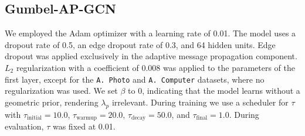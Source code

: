 \documentclass{gdl}
\begin{document}
\subsection{Gumbel-AP-GCN}
\label{lab:hyper-gumbel-gcn}
We employed the Adam optimizer with a learning rate of 0.01. The model uses a dropout rate of 0.5, an edge dropout rate of 0.3, and 64 hidden units. Edge dropout was applied exclusively in the adaptive message propagation component. $L_2$ regularization with a coefficient of 0.008 was applied to the parameters of the first layer, except for the \texttt{A. Photo} and \texttt{A. Computer} datasets, where no regularization was used. We set $\beta$ to 0, indicating that the model learns without a geometric prior, rendering $\lambda_p$ irrelevant. During training we use a scheduler for $\tau$ with $\tau_{\text{initial}} = 10.0$, $\tau_{\text{warmup}} = 20.0$, $\tau_{\text{decay}} = 50.0$, and $\tau_{\text{final}} = 1.0$. During evaluation, $\tau$ was fixed at 0.01.
\end{document}
